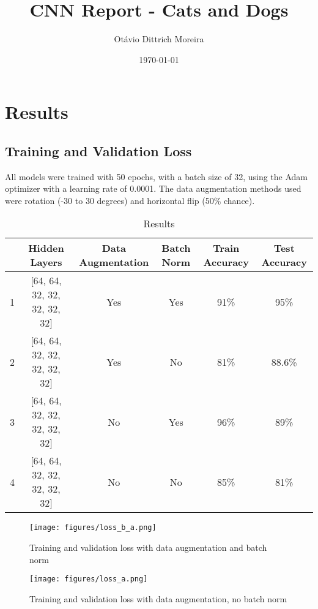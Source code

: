\documentclass{article}
\title{CNN Report - Cats and Dogs}
\author{Ot\'avio Dittrich Moreira}
\date{\today}
\begin{document}
\maketitle

\tableofcontents
\clearpage 

\section{Results}

\subsection{Training and Validation Loss}

All models were trained with 50 epochs, with a batch size of 32, using the Adam optimizer with a learning rate of 0.0001.
The data augmentation methods used were rotation (-30 to 30 degrees) and horizontal flip (50\% chance).
\begin{table}[htpb]
  \centering
  \caption{Results}
  \label{tab:label}
  \begin{tabular}{|cccccc|}
    \hline
      & Hidden Layers                & Data Augmentation & Batch Norm & Train Accuracy     &  Test Accuracy \\
    \hline
    \hline
    1 & [64, 64, 32, 32, 32, 32, 32] & Yes               & Yes        &    91\%            & 95\% \\
    \hline
    2 & [64, 64, 32, 32, 32, 32, 32] & Yes               & No         &    81\%            & 88.6\% \\
    \hline
    3 & [64, 64, 32, 32, 32, 32, 32] & No                & Yes        &    96\%            & 89\% \\
    \hline
    4 & [64, 64, 32, 32, 32, 32, 32] & No                & No         &    85\%            & 81\% \\
    \hline
  \end{tabular}
\end{table}



\begin{figure}[h]
    \centering
    \texttt{[image: figures/loss\_b\_a.png]}
    \caption{Training and validation loss with data augmentation and batch norm}
    \label{fig:loss}
\end{figure}

\begin{figure}[h]
    \centering
    \texttt{[image: figures/loss\_a.png]}
    \caption{Training and validation loss with data augmentation, no batch norm}
    \label{fig:loss}
  \end{figure}
\end{document}
